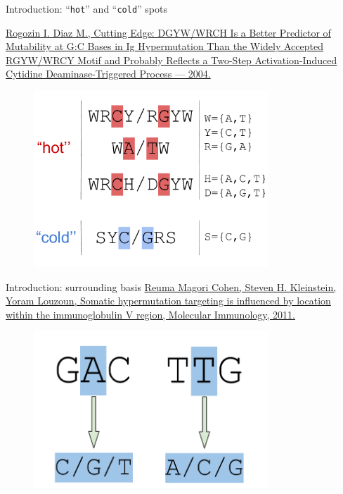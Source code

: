 \documentclass{beamer}\usepackage[]{graphicx}\usepackage[]{color}
\begin{document}
\begin{frame}{Introduction: ``\texttt{hot}'' and ``\texttt{cold}'' spots}
  
    {\footnotesize \href{http://www.jimmunol.org/content/172/6/3382.long}{Rogozin I. Diaz M., Cutting Edge: DGYW/WRCH Is a Better Predictor of Mutability at G:C Bases in Ig Hypermutation
Than the Widely Accepted RGYW/WRCY Motif and Probably Reflects a Two-Step Activation-Induced Cytidine Deaminase-Triggered Process --- 2004.}}
  \begin{figure}[h]
    \center\includegraphics[width=250pt]{Pictures/Hot_and_cold_spots.pdf}
 \end{figure}
\end{frame}

\begin{frame}{Introduction: surrounding basis}
    \href{http://www.sciencedirect.com/science/article/pii/S0161589011001192}{
    Reuma Magori Cohen, Steven H. Kleinstein, Yoram Louzoun, Somatic hypermutation targeting is influenced by location within the immunoglobulin V region, Molecular Immunology, 2011.}
  \begin{figure}[h]
    \center\includegraphics[width=250pt]{Pictures/three_surround.pdf}
 \end{figure}
\end{frame}
\end{document}
